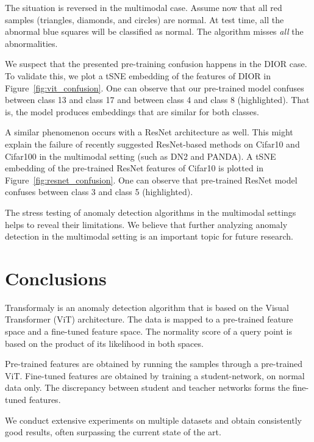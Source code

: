 \documentclass[10pt,twocolumn,letterpaper]{article}
\begin{document}
The situation is reversed in the multimodal case. Assume now that all red samples (triangles, diamonds, and circles) are normal. At test time, all the abnormal blue squares will be classified as normal. The algorithm misses {\em all} the abnormalities.

We suspect that the presented pre-training confusion happens in the DIOR case. 
To validate this, we plot a tSNE embedding of the features of DIOR in  Figure~\ref{fig:vit_confusion}. One can observe that our pre-trained model confuses between class 13 and class 17 and between class 4 and class 8 (highlighted). That is, the model produces embeddings that are similar for both classes.

A similar phenomenon occurs with a ResNet architecture as well. This might explain the failure of recently suggested ResNet-based methods on Cifar10 and Cifar100 in the multimodal setting (such as DN2 \cite{bergman2020deep} and PANDA\cite{reiss2020panda}). A tSNE embedding of the pre-trained ResNet features of Cifar10 is plotted in Figure~\ref{fig:resnet_confusion}. One can observe that pre-trained ResNet model confuses between class 3 and class 5 (highlighted). 

The stress testing of anomaly detection algorithms in the multimodal settings helps to reveal their limitations. We believe that further analyzing anomaly detection in the multimodal setting is an important topic for future research.











   
\section{Conclusions}

Transformaly is an anomaly detection algorithm that is based on the Visual Transformer (ViT) architecture. The data is mapped to a pre-trained feature space and a fine-tuned feature space. The normality score of a query point is based on the product of its likelihood in both spaces. 


Pre-trained features are obtained by running the samples through a pre-trained ViT. Fine-tuned features are obtained by training a student-network, on normal data only. The discrepancy between student and teacher networks forms the fine-tuned features.

We conduct extensive experiments on multiple datasets and obtain consistently good results, often surpassing the current state of the art.
\end{document}
